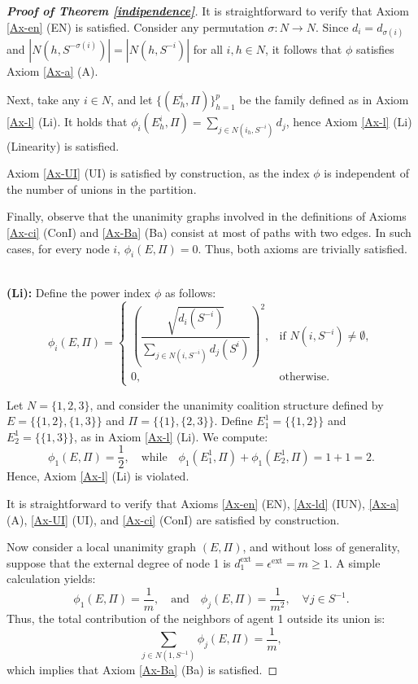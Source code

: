 \documentclass[preprint,11pt,authoryear]{elsarticle}
\theoremstyle{plain}
\begin{document}
\begin{proof}[\bf Proof of Theorem \ref{indipendence}]
	It is straightforward to verify that Axiom \ref{Ax-en} (EN) is satisfied. Consider any permutation $\sigma: N \to N$. Since $d_i = d_{\sigma(i)}$ and $|N(h, S^{-\sigma(i)})| = |N(h, S^{-i})|$ for all $i, h \in N$, it follows that $\phi$ satisfies Axiom \ref{Ax-a} (A).
	
	Next, take any $i \in N$, and let $\{(E_h^i, \Pi)\}_{h=1}^p$ be the family defined as in Axiom \ref{Ax-l} (Li). It holds that $\phi_i(E_h^i, \Pi) = \sum_{j \in N(i_h, S^{-i})} d_j$, hence Axiom \ref{Ax-l} (Li) (Linearity) is satisfied.
	
	Axiom \ref{Ax-UI} (UI) is satisfied by construction, as the index $\phi$ is independent of the number of unions in the partition.
	
	Finally, observe that the unanimity graphs involved in the definitions of Axioms \ref{Ax-ci} (ConI) and \ref{Ax-Ba} (Ba)  consist at most of paths with two edges. In such cases, for every node $i$, $\phi_i(E, \Pi) = 0$. Thus, both axioms are trivially satisfied.
	
	
	
	\noindent\vspace{.5\baselineskip}\\
	\textbf{(Li):} 
	Define the power index $\phi$ as follows:
	\begin{equation*}
		\phi_i(E, \Pi) = 
		\begin{cases}
			\left( \dfrac{\sqrt{d_i (S^{-i})}}{\sum_{j \in N(i, S^{-i})} d_j (S^{i})} \right)^2, & \text{if } N(i, S^{-i}) \neq \emptyset, \\
			0, & \text{otherwise}.
		\end{cases}
	\end{equation*}
	
	Let $N = \{1, 2, 3\}$, and consider the unanimity coalition structure defined by $E = \big\{ \{1,2\}, \{1,3\} \big\}$ and $\Pi = \big\{ \{1\}, \{2,3\} \big\}$. Define $E_1^1 = \big\{ \{1,2\} \big\}$ and $E_2^1 = \big\{ \{1,3\} \big\}$, as in Axiom \ref{Ax-l} (Li). We compute:
	\[
	\phi_1(E, \Pi) = \frac{1}{2}, \quad \text{while} \quad \phi_1(E_1^1, \Pi) + \phi_1(E_2^1, \Pi) = 1 + 1 = 2.
	\]
	Hence, Axiom \ref{Ax-l} (Li) is violated.
	
	It is straightforward to verify that Axioms \ref{Ax-en} (EN), \ref{Ax-ld} (IUN), \ref{Ax-a} (A), \ref{Ax-UI} (UI), and \ref{Ax-ci} (ConI) are satisfied by construction.
	
	Now consider a local unanimity graph $(E, \Pi)$, and without loss of generality, suppose that the external degree of node 1 is $d_1^{\text{ext}} = \epsilon^{\text{ext}} = m\geq 1$. A simple calculation yields:
	\[
	\phi_1(E, \Pi) = \frac{1}{m}, \quad \text{and} \quad \phi_j(E, \Pi) = \frac{1}{m^2}, \quad \forall j \in S^{-1}.
	\]
	Thus, the total contribution of the neighbors of agent 1 outside its union is:
	\[
	\sum_{j \in N(1, S^{-1})} \phi_j(E, \Pi) = \frac{1}{m},
	\]
	which implies that Axiom \ref{Ax-Ba} (Ba) is satisfied.
	

\end{proof}
\end{document}
